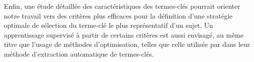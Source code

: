   Enfin, une étude détaillée des caractéristiques des termes-clés pourrait
  orienter notre travail vers des critères plus efficaces pour la définition
  d'une stratégie \og{}optimale\fg{} de sélection du terme-clé le plus
  représentatif d'un sujet. Un apprentissage supervisé à partir de certains
  critères est aussi envisagé, au même titre que l'usage de méthodes
  d'optimisation, telles que celle utilisée par
   dans leur méthode d'extraction
  automatique de termes-clés.

